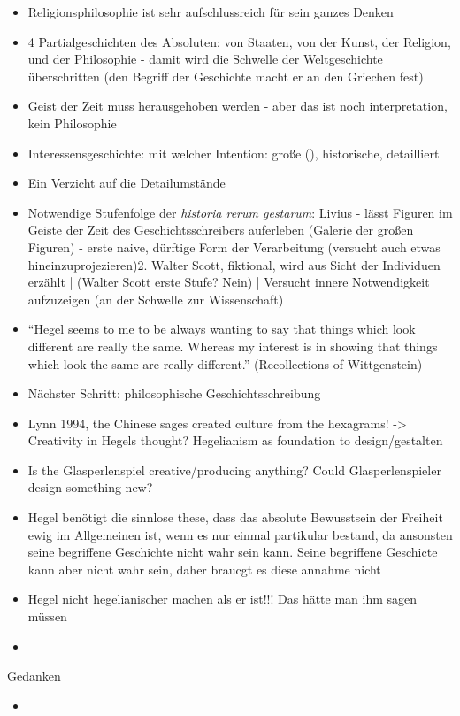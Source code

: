 \documentclass[emulatestandardclasses]{scrartcl}
\begin{document}
\begin{itemize}
  \item Religionsphilosophie ist sehr aufschlussreich für sein ganzes Denken
  \item 4 Partialgeschichten des Absoluten: von Staaten, von der Kunst, der Religion, und der Philosophie - damit wird die Schwelle der Weltgeschichte überschritten (den Begriff der Geschichte macht er an den Griechen fest)
  \item Geist der Zeit muss herausgehoben werden - aber das ist noch interpretation, kein Philosophie
  \item Interessensgeschichte: mit welcher Intention: große (), historische, detailliert
  \item Ein Verzicht auf die Detailumstände
  \item Notwendige Stufenfolge der \emph{historia rerum gestarum}: Livius - lässt Figuren im Geiste der Zeit des Geschichtsschreibers auferleben (Galerie der großen Figuren) - erste naive, dürftige Form der Verarbeitung (versucht auch etwas hineinzuprojezieren)2. Walter Scott, fiktional, wird aus Sicht der Individuen erzählt | (Walter Scott erste Stufe? Nein) | Versucht innere Notwendigkeit aufzuzeigen (an der Schwelle zur Wissenschaft)
  \item “Hegel seems to me to be always wanting to say that things which look different are really the same. Whereas my interest is in showing that things which look the same are really different.” (Recollections of Wittgenstein)
  \item Nächster Schritt: philosophische Geschichtsschreibung
  \item Lynn 1994, the Chinese sages created culture from the hexagrams! -> Creativity in Hegels thought? Hegelianism as foundation to design/gestalten
  \item Is the Glasperlenspiel creative/producing anything? Could Glasperlenspieler design something new?
  \item Hegel benötigt die sinnlose these, dass das absolute Bewusstsein der Freiheit ewig im Allgemeinen ist, wenn es nur einmal partikular bestand, da ansonsten seine begriffene Geschichte nicht wahr sein kann. Seine begriffene Geschicte kann aber nicht wahr sein, daher braucgt es diese annahme nicht
  \item Hegel nicht hegelianischer machen als er ist!!! Das hätte man ihm sagen müssen
  \item 
\end{itemize}

Gedanken

\begin{itemize}
  \item 
\end{itemize}
\end{document}
